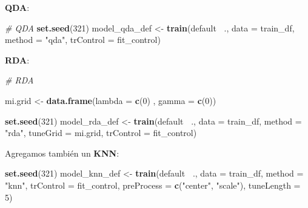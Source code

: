 \documentclass[]{book}
\newenvironment{Shaded}{\begin{snugshade}}{\end{snugshade}}
\newcommand{\CommentTok}[1]{\textcolor[rgb]{0.56,0.35,0.01}{\textit{#1}}}
\newcommand{\DataTypeTok}[1]{\textcolor[rgb]{0.13,0.29,0.53}{#1}}
\newcommand{\DecValTok}[1]{\textcolor[rgb]{0.00,0.00,0.81}{#1}}
\newcommand{\KeywordTok}[1]{\textcolor[rgb]{0.13,0.29,0.53}{\textbf{#1}}}
\newcommand{\NormalTok}[1]{#1}
\newcommand{\OperatorTok}[1]{\textcolor[rgb]{0.81,0.36,0.00}{\textbf{#1}}}
\newcommand{\StringTok}[1]{\textcolor[rgb]{0.31,0.60,0.02}{#1}}
\begin{document}
\textbf{QDA}:

\begin{Shaded}
\begin{Highlighting}[]
\CommentTok{# QDA}
\KeywordTok{set.seed}\NormalTok{(}\DecValTok{321}\NormalTok{)}
\NormalTok{model_qda_def <-}\StringTok{ }\KeywordTok{train}\NormalTok{(default }\OperatorTok{~}\NormalTok{.,}
                       \DataTypeTok{data =}\NormalTok{ train_df,}
                       \DataTypeTok{method =} \StringTok{"qda"}\NormalTok{,}
                       \DataTypeTok{trControl =}\NormalTok{ fit_control)}
\end{Highlighting}
\end{Shaded}

\textbf{RDA}:

\begin{Shaded}
\begin{Highlighting}[]
\CommentTok{# RDA}

\NormalTok{mi.grid <-}\StringTok{ }\KeywordTok{data.frame}\NormalTok{(}\DataTypeTok{lambda =} \KeywordTok{c}\NormalTok{(}\DecValTok{0}\NormalTok{) , }
                       \DataTypeTok{gamma =} \KeywordTok{c}\NormalTok{(}\DecValTok{0}\NormalTok{))}

\KeywordTok{set.seed}\NormalTok{(}\DecValTok{321}\NormalTok{)}
\NormalTok{model_rda_def <-}\StringTok{ }\KeywordTok{train}\NormalTok{(default }\OperatorTok{~}\NormalTok{.,}
                       \DataTypeTok{data =}\NormalTok{ train_df,}
                       \DataTypeTok{method =} \StringTok{"rda"}\NormalTok{,}
                       \DataTypeTok{tuneGrid =}\NormalTok{ mi.grid,}
                       \DataTypeTok{trControl =}\NormalTok{ fit_control)}
\end{Highlighting}
\end{Shaded}

Agregamos también un \textbf{KNN}:

\begin{Shaded}
\begin{Highlighting}[]
\KeywordTok{set.seed}\NormalTok{(}\DecValTok{321}\NormalTok{)}
\NormalTok{model_knn_def <-}\StringTok{ }\KeywordTok{train}\NormalTok{(default }\OperatorTok{~}\NormalTok{.,}
                       \DataTypeTok{data =}\NormalTok{ train_df,}
                       \DataTypeTok{method =} \StringTok{"knn"}\NormalTok{,}
                       \DataTypeTok{trControl =}\NormalTok{ fit_control,}
                       \DataTypeTok{preProcess =} \KeywordTok{c}\NormalTok{(}\StringTok{"center"}\NormalTok{, }\StringTok{"scale"}\NormalTok{),}
                       \DataTypeTok{tuneLength =} \DecValTok{5}\NormalTok{)}
\end{Highlighting}
\end{Shaded}
\end{document}
